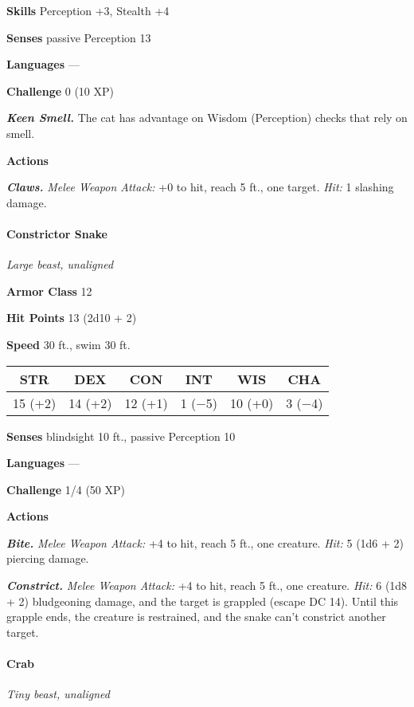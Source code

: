 \documentclass[
]{article}
\begin{document}
\textbf{Skills} Perception +3, Stealth +4

\textbf{Senses} passive Perception 13

\textbf{Languages} ---

\textbf{Challenge} 0 (10 XP)

\emph{\textbf{Keen Smell.}} The cat has advantage on Wisdom (Perception)
checks that rely on smell.

\textbf{Actions}

\emph{\textbf{Claws.}} \emph{Melee Weapon Attack:} +0 to hit, reach 5
ft., one target. \emph{Hit:} 1 slashing damage.

\hypertarget{constrictor-snake}{%
\paragraph{Constrictor Snake}\label{constrictor-snake}}

\emph{Large beast, unaligned}

\textbf{Armor Class} 12

\textbf{Hit Points} 13 (2d10 + 2)

\textbf{Speed} 30 ft., swim 30 ft.

\begin{longtable}[]{@{}cccccc@{}}
\toprule
STR & DEX & CON & INT & WIS & CHA\tabularnewline
\midrule
\endhead
15 (+2) & 14 (+2) & 12 (+1) & 1 (−5) & 10 (+0) & 3 (−4)\tabularnewline
\bottomrule
\end{longtable}

\textbf{Senses} blindsight 10 ft., passive Perception 10

\textbf{Languages} ---

\textbf{Challenge} 1/4 (50 XP)

\textbf{Actions}

\emph{\textbf{Bite.}} \emph{Melee Weapon Attack:} +4 to hit, reach 5
ft., one creature. \emph{Hit:} 5 (1d6 + 2) piercing damage.

\emph{\textbf{Constrict.}} \emph{Melee Weapon Attack:} +4 to hit, reach
5 ft., one creature. \emph{Hit:} 6 (1d8 + 2) bludgeoning damage, and the
target is grappled (escape DC 14). Until this grapple ends, the creature
is restrained, and the snake can't constrict another target.

\hypertarget{crab}{%
\paragraph{Crab}\label{crab}}

\emph{Tiny beast, unaligned}
\end{document}
